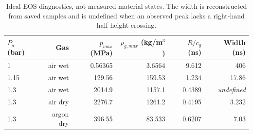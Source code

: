 \begin{table}[H]\centering\small
\begin{tabular}{lrrrrr}
\toprule
$P_a$ (bar) & Gas & $p_{max}$ (MPa) & $\rho_{g,max}$ (kg/m$^3$) & $R/c_g$ (ns) & Width (ns) \\ \midrule
1 & air wet & 0.56365 & 3.6564 & 9.612 & 406 \\
1.15 & air wet & 129.56 & 159.53 & 1.234 & 17.86 \\
1.3 & air wet & 2014.9 & 1157.1 & 0.4389 & \textit{undefined} \\
1.3 & air dry & 2276.7 & 1261.2 & 0.4195 & 3.232 \\
1.3 & argon dry & 396.55 & 83.533 & 0.6207 & 7.03 \\
\bottomrule\end{tabular}
\caption{Ideal-EOS diagnostics, not measured material states. The width is reconstructed from saved samples and is undefined when an observed peak lacks a right-hand half-height crossing.}
\end{table}
